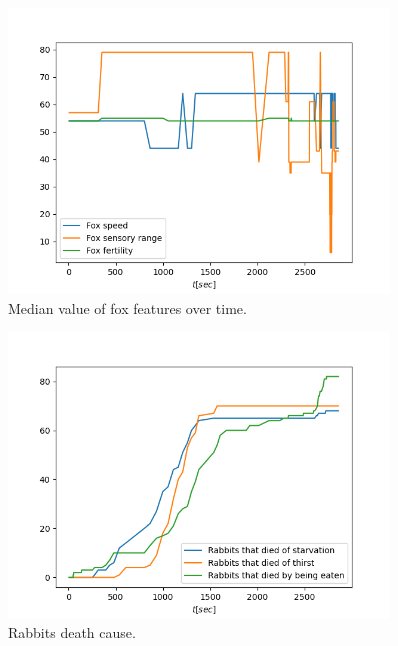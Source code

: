\begin{figure}[H]
    \centering
    \includegraphics[width=0.9\textwidth]{Images/SimulationResults/Simulation_6_Fox speed_Fox sensory range_Fox fertility.png}
    \caption{Median value of fox features over time.}
    \label{fig:simulation4FoxFeaturesMedian}
\end{figure}

\begin{figure}[H]
    \centering
    \includegraphics[width=0.9\textwidth]{Images/SimulationResults/Simulation_6_Rabbits that died of starvation_Rabbits that died of thirst_Rabbits that died by being eaten.png}
    \caption{Rabbits death cause.}
    \label{fig:simulation4RabbitDeathCause}
\end{figure}

